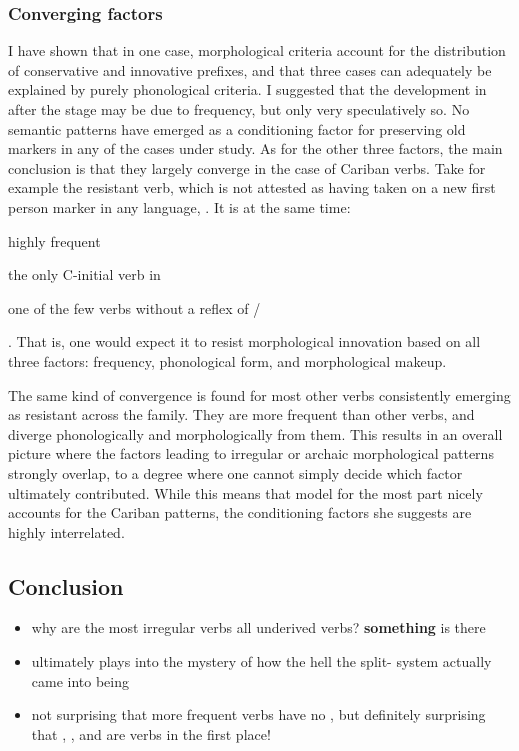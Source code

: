 \subsubsection{Converging factors}
\label{sec:convergence}
I have shown that in one case, morphological criteria account for the distribution of conservative and innovative prefixes, and that three cases can adequately be explained by purely phonological criteria.
I suggested that the development in \bakairi after the \PPek stage may be due to frequency, but only very speculatively so.
No semantic patterns have emerged as a conditioning factor for preserving old  markers in any of the cases under study.
As for the other three factors, the main conclusion is that they largely converge in the case of Cariban  verbs.
Take for example the  resistant verb, which is not attested as having taken on a new first person marker in any language,  .
It is at the same time: \begin{inlinelist}
	\item highly frequent
	\item the only C-initial  verb in \PC
	\item one of the few  verbs without a reflex of /
\end{inlinelist}.
That is, one would expect it to resist morphological innovation based on all three factors: frequency, phonological form, and morphological makeup.

The same kind of convergence is found for most other verbs consistently emerging as resistant across the family.
They are more frequent than other  verbs, and diverge phonologically and morphologically from them.
This results in an overall picture where the factors leading to irregular or archaic morphological patterns strongly overlap, to a degree where one cannot simply decide which factor ultimately contributed.
While this means that  model for the most part nicely accounts for the Cariban patterns, the conditioning factors she suggests are highly interrelated.

\subsection{Conclusion}

\begin{itemize}
	\item why are the most irregular verbs all underived  verbs? \textbf{something} is there
	\item ultimately plays into the mystery of how the hell the split- system actually came into being
	\item not surprising that more frequent  verbs have no , but definitely surprising that , , and  are  verbs in the first place!
\end{itemize}

